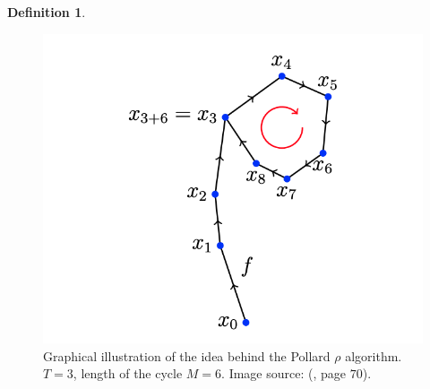 \documentclass[thesis=M,english]{FITthesis}[2012/10/20]
\theoremstyle{remark}
\theoremstyle{definition}
\newtheorem{DF}{Definition}[section]
\begin{document}
\begin{DF}
 \begin{figure}[h]
 \centering
 \hspace*{-1cm}
 	\includegraphics[width=1\textwidth]{rho.png}
 	\caption[Graphical illustration of Pollard $\rho$ collision idea]{Graphical illustration of the idea behind the Pollard $\rho$ algorithm. $T = 3$, length of the cycle $M = 6$. Image source: (\cite{mky}, page $70$).}
 	\label{rho}
 \end{figure}
 \end{DF}
\end{document}
